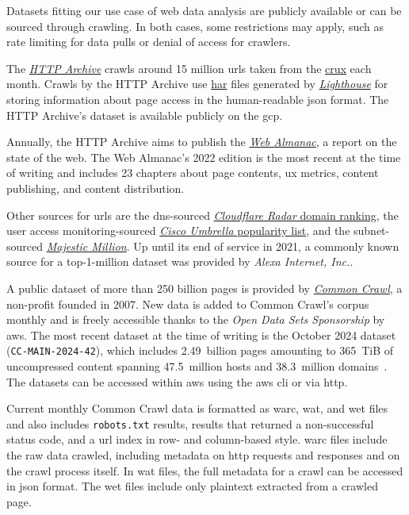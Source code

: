 Datasets fitting our use case of web data analysis are publicly available or can be sourced through crawling.
In both cases, some restrictions may apply, such as rate limiting for data pulls or denial of access for crawlers.

The \href{https://httparchive.org/}{\textit{HTTP Archive}} crawls around 15 million \acp{url} taken from the \href{https://developer.chrome.com/docs/crux}{\ac{crux}} each month.
Crawls by the HTTP Archive use \href{https://w3c.github.io/web-performance/specs/HAR/Overview.html}{\ac{har}} files generated by \href{https://developer.chrome.com/docs/lighthouse/}{\textit{Lighthouse}} for storing information about page access in the human-readable \ac{json} format.
The HTTP Archive's dataset is available publicly on the \ac{gcp}.

Annually, the HTTP Archive aims to publish the \href{https://almanac.httparchive.org/}{\textit{Web Almanac}}, a report on the state of the web.
The Web Almanac's 2022 edition is the most recent at the time of writing and includes 23 chapters about page contents, \ac{ux} metrics, content publishing, and content distribution.

Other sources for \acp{url} are the \ac{dns}-sourced \href{https://radar.cloudflare.com/domains}{\textit{Cloudflare Radar} domain ranking}, the user access monitoring-sourced \href{https://s3-us-west-1.amazonaws.com/umbrella-static/index.html}{\textit{Cisco Umbrella} popularity list}, and the subnet-sourced \href{https://majestic.com/reports/majestic-million}{\textit{Majestic Million}}.
Up until its end of service in 2021, a commonly known source for a top-1-million dataset was provided by \textit{Alexa Internet, Inc.}.

A public dataset of more than 250 billion pages is provided by \href{https://commoncrawl.org/}{\textit{Common Crawl}}, a non-profit founded in 2007.
New data is added to Common Crawl's corpus monthly and is freely accessible thanks to the \textit{Open Data Sets Sponsorship} by \ac{aws}.
The most recent dataset at the time of writing is the October 2024 dataset (\texttt{CC-MAIN-2024-42}), which includes 2.49~billion pages amounting to 365~TiB of uncompressed content spanning 47.5~million hosts and 38.3~million domains~\cite{Vaughan2024}.
The datasets can be accessed within \ac{aws} using the \ac{aws} \ac{cli} or via \ac{http}.

Current monthly Common Crawl data is formatted as \ac{warc}, \ac{wat}, and \ac{wet} files and also includes \texttt{ro\-bots\-.txt} results, results that returned a non-successful status code, and a \ac{url} index in row- and column-based style.
\ac{warc} files include the raw data crawled, including metadata on \ac{http} requests and responses and on the crawl process itself.
In \ac{wat} files, the full metadata for a crawl can be accessed in \ac{json} format.
The \ac{wet} files include only plaintext extracted from a crawled page.

